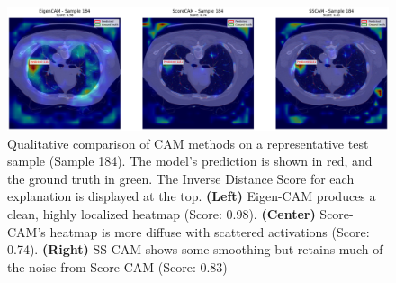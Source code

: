 \begin{figure}[h]
    \centering
    \includegraphics[width=1\linewidth]{images/xai-sample-184.png}
    \caption{Qualitative comparison of CAM methods on a representative test sample (Sample 184). The model's prediction is shown in red, and the ground truth in green. The Inverse Distance Score for each explanation is displayed at the top. \textbf{(Left)} Eigen-CAM produces a clean, highly localized heatmap (Score: 0.98). \textbf{(Center)} Score-CAM's heatmap is more diffuse with scattered activations (Score: 0.74). \textbf{(Right)} SS-CAM shows some smoothing but retains much of the noise from Score-CAM (Score: 0.83)}
    \label{fig:xai-qualitative-example}
\end{figure}
